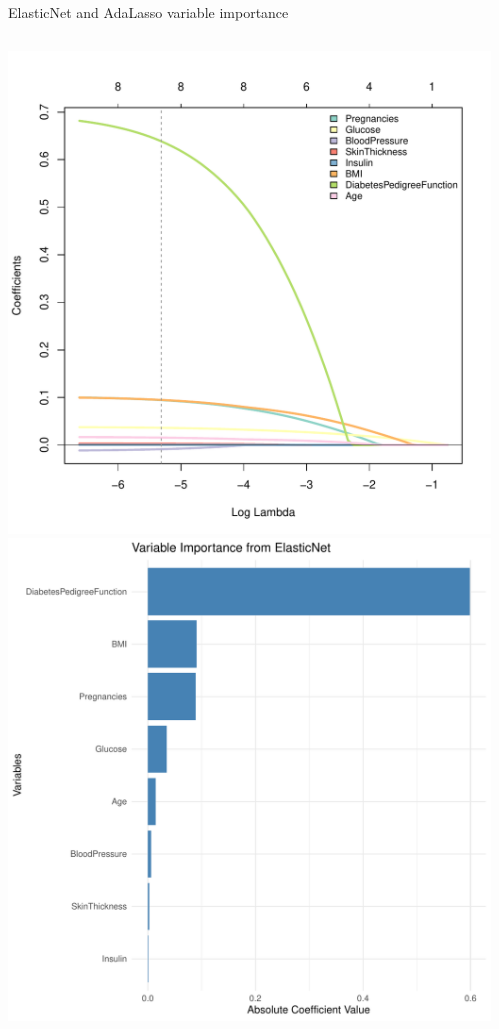 \begin{frame}{ElasticNet and AdaLasso variable importance}

\vspace*{-1em}\begin{columns}[T]
\begin{column}{0.5\textwidth}
\includegraphics[width=0.85\columnwidth]{plots/diabetes_elasticnet.pdf}
\includegraphics[width=0.7\columnwidth]{plots/variable_importance_elasticnet.pdf}
\end{column}
\begin{column}{0.5\textwidth}

\end{column}
\end{columns}
\end{frame}
